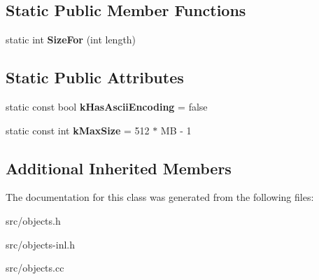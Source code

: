 \subsection*{Static Public Member Functions}
\begin{DoxyCompactItemize}
\item 
\hypertarget{classv8_1_1internal_1_1_seq_two_byte_string_a310700be9011633ec0da472bb31c16a9}{}static int {\bfseries Size\+For} (int length)\label{classv8_1_1internal_1_1_seq_two_byte_string_a310700be9011633ec0da472bb31c16a9}

\end{DoxyCompactItemize}
\subsection*{Static Public Attributes}
\begin{DoxyCompactItemize}
\item 
\hypertarget{classv8_1_1internal_1_1_seq_two_byte_string_a4edf3c8a76b14309487c691d10e7af45}{}static const bool {\bfseries k\+Has\+Ascii\+Encoding} = false\label{classv8_1_1internal_1_1_seq_two_byte_string_a4edf3c8a76b14309487c691d10e7af45}

\item 
\hypertarget{classv8_1_1internal_1_1_seq_two_byte_string_aea5b549a060721065740b5c3585a4cac}{}static const int {\bfseries k\+Max\+Size} = 512 $\ast$ M\+B -\/ 1\label{classv8_1_1internal_1_1_seq_two_byte_string_aea5b549a060721065740b5c3585a4cac}

\end{DoxyCompactItemize}
\subsection*{Additional Inherited Members}


The documentation for this class was generated from the following files\+:\begin{DoxyCompactItemize}
\item 
src/objects.\+h\item 
src/objects-\/inl.\+h\item 
src/objects.\+cc\end{DoxyCompactItemize}
